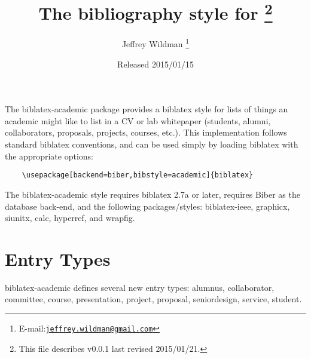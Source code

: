\documentclass[11pt,letterpaper]{article}
\author{Jeffrey Wildman%
  \thanks{E-mail:\href{mailto:jeffrey.wildman@gmail.com}%
  {\texttt{jeffrey.wildman@gmail.com}}}
}
\title{The \pkg{academic} bibliography style for \pkg{biblatex}%
  \footnote{This file describes v0.0.1 last revised 2015/01/21.}%
}
\date{Released 2015/01/15}
\newcommand{\pkg}[1]{\textsf{#1}}
\newcommand{\entry}[1]{\textsf{#1}}
\begin{document}
\maketitle

The \pkg{biblatex-academic} package provides a \pkg{biblatex} style for lists of things an academic might like to list in a CV or lab whitepaper (students, alumni, collaborators, proposals, projects, courses, etc.).
This implementation follows standard \pkg{biblatex} conventions, and can be used simply by loading \pkg{biblatex} with the appropriate options:
\begin{verbatim}
    \usepackage[backend=biber,bibstyle=academic]{biblatex}
\end{verbatim}
The \pkg{biblatex-academic} style requires \pkg{biblatex} 2.7a or later, requires \pkg{Biber} as the database back-end, and the following packages/styles: \pkg{biblatex-ieee}, \pkg{graphicx}, \pkg{siunitx}, \pkg{calc}, \pkg{hyperref}, and \pkg{wrapfig}.


\section{Entry Types}\label{sec:entry-types}

\pkg{biblatex-academic} defines several new entry types: 
\entry{alumnus}, 
\entry{collaborator}, 
\entry{committee},
\entry{course}, 
\entry{presentation}, 
\entry{project}, 
\entry{proposal}, 
\entry{seniordesign}, 
\entry{service},
\entry{student}. 
\end{document}
